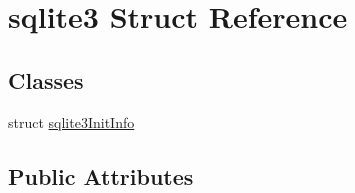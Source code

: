 \hypertarget{structsqlite3}{}\section{sqlite3 Struct Reference}
\label{structsqlite3}
\subsection*{Classes}
\begin{DoxyCompactItemize}
\item 
struct \mbox{\hyperlink{structsqlite3_1_1sqlite3_init_info}{sqlite3\+Init\+Info}}
\end{DoxyCompactItemize}
\subsection*{Public Attributes}
